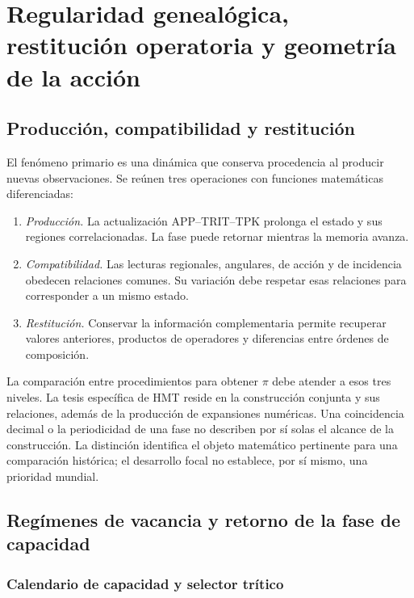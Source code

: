 \section{Regularidad genealógica, restitución operatoria y geometría de la acción}
\label{md:restop:seccion}

\subsection{Producción, compatibilidad y restitución}
\label{md:restop:jerarquia}

El fenómeno primario es una dinámica que conserva procedencia al producir
nuevas observaciones. Se reúnen tres operaciones con funciones matemáticas
diferenciadas:
\begin{enumerate}
 \item \emph{Producción.} La actualización APP--TRIT--TPK prolonga el estado
 y sus regiones correlacionadas. La fase puede retornar mientras la memoria
 avanza.
 \item \emph{Compatibilidad.} Las lecturas regionales, angulares, de acción
 y de incidencia obedecen relaciones comunes. Su variación debe respetar
 esas relaciones para corresponder a un mismo estado.
 \item \emph{Restitución.} Conservar la información complementaria permite
 recuperar valores anteriores, productos de operadores y diferencias
 entre órdenes de composición.
\end{enumerate}
La comparación entre procedimientos para obtener $\pi$ debe atender a esos
tres niveles. La tesis específica de HMT reside en la construcción conjunta
y sus relaciones, además de la producción de expansiones numéricas.
Una coincidencia decimal o la periodicidad de una fase no describen por sí
solas el alcance de la construcción. La distinción identifica el objeto
matemático pertinente para una comparación histórica; el desarrollo focal
no establece, por sí mismo, una prioridad mundial.

\subsection{Regímenes de vacancia y retorno de la fase de capacidad}
\label{md:restop:vacancias}

\subsubsection{Calendario de capacidad y selector trítico}
\label{md:restop:antecedentes-capacidad}

